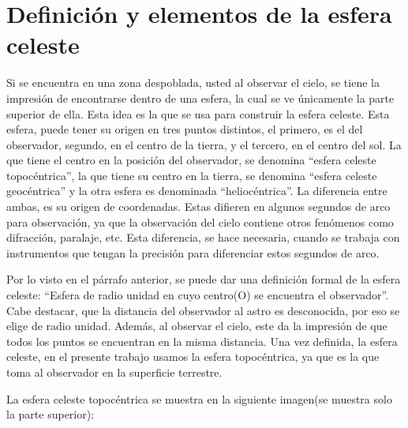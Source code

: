 \section{Definición y elementos de la esfera celeste}
Si se encuentra en una zona despoblada, usted al observar el cielo, se tiene la impresión de encontrarse dentro de una esfera, la cual se ve únicamente la parte superior de ella. Esta idea es la que se usa para construir la esfera celeste. Esta esfera, puede tener su origen en tres puntos distintos, el primero, es el del observador, segundo, en el centro de la tierra, y el tercero, en el centro del sol. La que tiene el centro en la posición del observador, se denomina ``esfera celeste topocéntrica'', la que tiene su centro en la tierra, se denomina ``esfera celeste geocéntrica'' y la otra esfera es denominada ``heliocéntrica''. La diferencia entre ambas, es su origen de coordenadas. Estas difieren en algunos segundos de arco para observación, ya que la observación del cielo contiene otros fenómenos como difracción, paralaje, etc. Esta diferencia, se hace necesaria, cuando se trabaja con instrumentos que tengan la precisión para diferenciar estos segundos de arco.


Por lo visto en el párrafo anterior, se puede dar una definición formal de la esfera celeste: ``Esfera de radio unidad en cuyo centro(O) se encuentra el observador''. Cabe destacar, que la distancia del observador al astro es desconocida, por eso se elige de radio unidad. Además, al observar el cielo, este da la impresión de que todos los puntos se encuentran en la misma distancia. Una vez definida, la esfera celeste, en el presente trabajo usamos la esfera topocéntrica, ya que es la que toma al observador en la superficie terrestre.


La esfera celeste topocéntrica se muestra en la siguiente imagen(se muestra solo la parte superior): 

